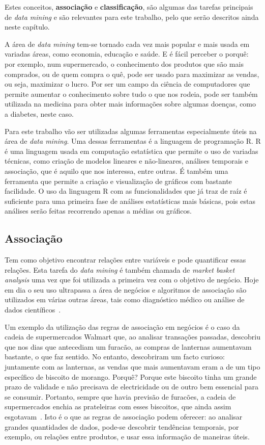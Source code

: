 Estes conceitos, \textbf{associação} e \textbf{classificação}, são algumas das tarefas principais de \textit{data mining} e são relevantes para este trabalho, pelo que serão descritos ainda neste capítulo.


A área de \textit{data mining} tem-se tornado cada vez mais popular e mais usada em variadas áreas, como economia, educação e saúde. E é fácil perceber o porquê: por exemplo, num supermercado, o conhecimento dos produtos que são mais comprados, ou de quem compra o quê, pode ser usado para maximizar as vendas, ou seja, maximizar o lucro.\cite{business} Por ser um campo da ciência de computadores que permite aumentar o conhecimento sobre tudo o que nos rodeia, pode ser também utilizada na medicina para obter mais informações sobre algumas doenças, como a diabetes, neste caso.

Para este trabalho vão ser utilizadas algumas ferramentas especialmente úteis na área de \textit{data mining}. Uma dessas ferramentas é a linguagem de programação R. R é uma linguagem usada em computação estatística que permite o uso de variadas técnicas, como criação de modelos lineares e não-lineares, análises temporais e associação, que é aquilo que nos interessa, entre outras. É também uma ferramenta que permite a criação e visualização de gráficos com bastante facilidade. O uso da linguagem R com as funcionalidades que já traz de raíz é suficiente para uma primeira fase de análises estatísticas mais básicas, pois estas análises serão feitas recorrendo apenas a médias ou gráficos.

\subsection{Associação}

Tem como objetivo encontrar relações entre variáveis e pode quantificar essas relações. Esta tarefa do \textit{data mining} é também chamada de \textit{market basket analysis} uma vez que foi utilizada a primeira vez com o objetivo de negócio.\cite{business} Hoje em dia o seu uso ultrapassa a área de negócios e algoritmos de associação são utilizados em várias outras áreas, tais como diagnóstico médico ou análise de dados científicos~\cite{chapter6}.

Um exemplo da utilização das regras de associação em negócios é o caso da cadeia de supermercados Walmart que, ao analisar transações passadas, descobriu que nos dias que antecediam um furacão, as compras de lanternas aumentavam bastante, o que faz sentido. No entanto, descobriram um facto curioso: juntamente com as lanternas, as vendas que mais aumentavam eram a de um tipo específico de biscoito de morango. Porquê? Porque este biscoito tinha um grande prazo de validade e não precisava de electricidade ou de outro bem essencial para se consumir. Portanto, sempre que havia previsão de furacões, a cadeia de supermercados enchia as prateleiras com esses biscoitos, que ainda assim esgotavam~\cite{walmart}.
Isto é o que as regras de associação podem oferecer: ao analisar grandes quantidades de dados, pode-se descobrir tendências temporais, por exemplo, ou relações entre produtos, e usar essa informação de maneiras úteis. 

